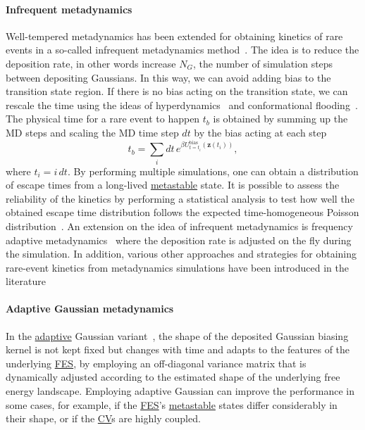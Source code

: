 \documentclass[9pt,review]{livecoms}
\newcommand{\vz}{\mathbf{z}}
\begin{document}
\paragraph{Infrequent metadynamics}
\label{sec:infreq_meta}
Well-tempered metadynamics has been extended for obtaining kinetics of rare events in a so-called infrequent metadynamics method~\cite{Tiwary-PRL-2013}. The idea is to reduce the deposition rate, in other words increase $N_{G}$, the number of simulation steps between depositing Gaussians. In this way, we can avoid adding bias to the transition state region. If there is no bias acting on the transition state, we can rescale the time using the ideas of hyperdynamics~\cite{Voter-PRL-1997} and conformational flooding~\cite{Grubmuller-PRE-1995}. The physical time for a rare event to happen $t_b$ is obtained by summing up the MD steps and scaling the MD time step $dt$ by the bias acting at each step
\begin{equation}
\label{wtmetad_hyperdynamics}
t_b = \sum_{i} dt \, e^{\beta U_{t=t_{i}}^{\mathrm{bias}}(\vz(t_{i}))},
\end{equation}
where $t_{i} = i\, dt$. By performing multiple simulations, one can obtain a distribution of escape times from a long-lived \hyperlink{ref:metastab} {metastable} state. It is possible to assess the reliability of the kinetics by performing a statistical analysis to test how well the obtained escape time distribution follows the expected time-homogeneous Poisson distribution~\cite{KS_Test_JCTC_2014}. An extension on the idea of infrequent metadynamics is frequency adaptive metadynamics~\cite{Wang2018_FA-MetaD} where the deposition rate is adjusted on the fly during the simulation. In addition, various other approaches and strategies for obtaining rare-event kinetics from metadynamics simulations have been introduced in the literature~\cite{
10.1021/acs.biochem.8b00977,
10.1021/ar500356n,
10.1371/journal.pcbi.1000452,
10.1021/ja903045y,
10.1103/physrevlett.110.108106,
10.1063/1.5027728,
10.1103/physreve.98.052408,
10.1063/5.0019100,
10.1021/acs.jpclett.2c01807}

\paragraph{Adaptive Gaussian metadynamics}
\label{sec:AGmeta}
In the \hyperlink{ref:Adaptive} {adaptive} Gaussian variant~\cite{Branduardi-JCTC-2012}, the shape of the deposited Gaussian biasing kernel is not kept fixed but changes with time and adapts to the features of the underlying \hyperlink{ref:FES} {FES}, by employing an off-diagonal variance matrix that is dynamically adjusted according to the estimated shape of the underlying free energy landscape. Employing adaptive Gaussian can improve the performance in some cases, for example, if the \hyperlink{ref:FES} {FES}'s \hyperlink{ref:metastab} {metastable} states differ considerably in their shape, or if the \hyperlink{ref:CV} {CV}s are highly coupled.
\end{document}
